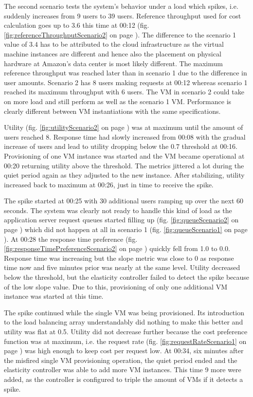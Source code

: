 \documentclass[english]{tktltiki2}
\theoremstyle{definition}
\theoremstyle{remark}
\begin{document}
The second scenario tests the system's behavior under a load which spikes, i.e.
suddenly increases from 9 users to 39 users. Reference throughput used for cost
calculation goes up to $3.6$ this time at 00:12 (fig.
\ref{fig:referenceThroughputScenario2} on page
\pageref{fig:referenceThroughputScenario2}). The difference to the scenario 1 value
of $3.4$ has to be attributed to the cloud infrastructure as the virtual machine
instances are different and hence also the placement on physical hardware at
Amazon's data center is most likely different. The maximum reference throughput
was reached later than in scenario 1 due to the difference in user amounts.
Scenario 2 has 8 users making requests at 00:12 whereas scenario 1 reached its
maximum throughput with 6 users. The VM in scenario 2 could take on more load and still perform as well as the scenario 1 VM. Performance is clearly different
between VM instantiations with the same specifications.

Utility (fig. \ref{fig:utilityScenario2} on page \pageref{fig:utilityScenario2})
was at maximum until the amount of users reached 8. Response time had slowly
increased from 00:08 with the gradual increase of users and lead to utility
dropping below the $0.7$ threshold at 00:16. Provisioning of one VM instance was
started and the VM became operational at 00:20 returning utility above the
threshold. The metrics jittered a lot during the quiet period again as they
adjusted to the new instance. After stabilizing, utility increased back to
maximum at 00:26, just in time to receive the spike.

The spike started at 00:25 with 30 additional users ramping up over the next 60
seconds. The system was clearly not ready to handle this kind of load as the
application server request queues started filling up (fig.
\ref{fig:queueScenario2} on page \pageref{fig:queueScenario2}) which did not
happen at all in scenario 1 (fig. \ref{fig:queueScenario1} on page
\pageref{fig:queueScenario1}). At 00:28 the response time preference (fig.
\ref{fig:responseTimePreferenceScenario2} on page
\pageref{fig:responseTimePreferenceScenario2}) quickly fell from 1.0 to 0.0.
Response time was increasing but the slope metric was close to 0 as response
time now and five minutes prior was nearly at the same level. Utility decreased
below the threshold, but the elasticity controller failed to detect the spike
because of the low slope value. Due to this, provisioning of only one additional
VM instance was started at this time.

The spike continued while the single VM was being provisioned. Its introduction
to the load balancing array understandably did nothing to make this better and
utility was flat at 0.5. Utility did not decrease further because the cost
preference function was at maximum, i.e. the request rate (fig.
\ref{fig:requestRateScenario1} on page \pageref{fig:requestRateScenario1}) was
high enough to keep cost per request low. At 00:34, six minutes after the
misfired single VM provisioning operation, the quiet period ended and the
elasticity controller was able to add more VM instances. This time 9 more were
added, as the controller is configured to triple the amount of VMs if it detects
a spike.
\end{document}
